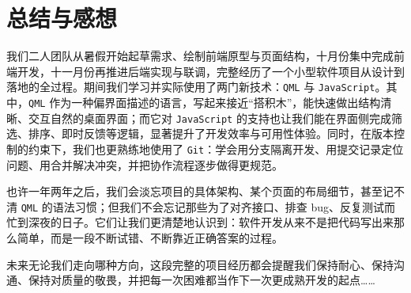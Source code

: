 \documentclass{article}
\begin{document}
	\section{总结与感想}
		我们二人团队从暑假开始起草需求、绘制前端原型与页面结构，十月份集中完成前端开发，十一月份再推进后端实现与联调，完整经历了一个小型软件项目从设计到落地的全过程。期间我们学习并实际使用了两门新技术：\texttt{QML} 与 \texttt{JavaScript}。其中，\texttt{QML} 作为一种偏界面描述的语言，写起来接近“搭积木”，能快速做出结构清晰、交互自然的桌面界面；而它对 \texttt{JavaScript} 的支持也让我们能在界面侧完成筛选、排序、即时反馈等逻辑，显著提升了开发效率与可用性体验。同时，在版本控制的约束下，我们也更熟练地使用了 \texttt{Git}：学会用分支隔离开发、用提交记录定位问题、用合并解决冲突，并把协作流程逐步做得更规范。
		
		也许一年两年之后，我们会淡忘项目的具体架构、某个页面的布局细节，甚至记不清 \texttt{QML} 的语法习惯；但我们不会忘记那些为了对齐接口、排查 bug、反复测试而忙到深夜的日子。它们让我们更清楚地认识到：软件开发从来不是把代码写出来那么简单，而是一段不断试错、不断靠近正确答案的过程。
		
		未来无论我们走向哪种方向，这段完整的项目经历都会提醒我们保持耐心、保持沟通、保持对质量的敬畏，并把每一次困难都当作下一次更成熟开发的起点……
\end{document}
